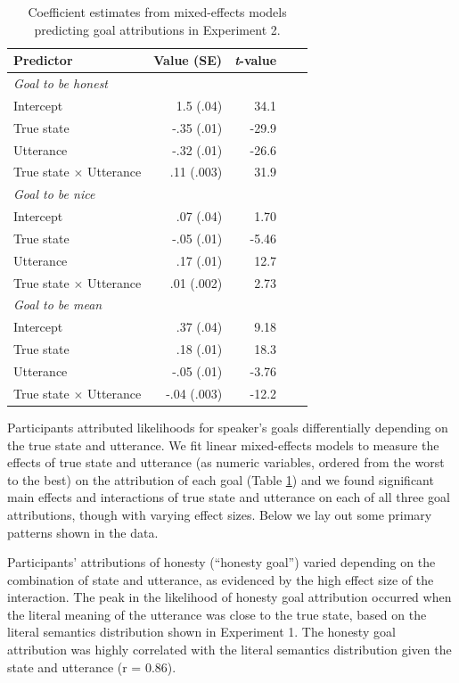 \documentclass[10pt,letterpaper]{article}
\begin{document}
\begin{table}[t]
\caption{\label{tab:lmer1}  Coefficient estimates from mixed-effects models predicting goal attributions in Experiment 2.} 
\begin{center} 
\begin{tabular}{l r r r l} 
\hline
Predictor  &  Value (SE) & \emph{t}-value\\
\hline
\emph{Goal to be honest} \\
Intercept  & 1.5 (.04) & 34.1 \\
True state & -.35 (.01) &  -29.9 \\
Utterance & -.32 (.01) & -26.6 \\
True state $\times$ Utterance & .11 (.003) & 31.9 \\
\emph{Goal to be nice} \\
Intercept  & .07 (.04) & 1.70\\
True state & -.05 (.01) &  -5.46 \\
Utterance & .17 (.01) & 12.7 \\
True state $\times$ Utterance & .01 (.002) & 2.73 \\
\emph{Goal to be mean} \\ 
Intercept  & .37 (.04) & 9.18 \\
True state & .18 (.01) &  18.3 \\
Utterance & -.05 (.01) & -3.76 \\
True state $\times$ Utterance & -.04 (.003) & -12.2 \\
\hline
\end{tabular} 
\end{center} 
\end{table}

Participants attributed likelihoods for speaker's goals differentially depending on the true state and utterance. We fit linear mixed-effects models to measure the effects of true state and utterance (as numeric variables, ordered from the worst to the best) on the attribution of each goal (Table \ref{tab:lmer1}) and we found significant main effects and interactions of true state and utterance on each of all three goal attributions, though with varying effect sizes. Below we lay out some primary patterns shown in the data. %

Participants' attributions of honesty (``honesty goal'') varied depending on the combination of state and utterance, as evidenced by the high effect size of the interaction. The peak in the likelihood of honesty goal attribution occurred when the literal meaning of the utterance was close to the true state, based on the literal semantics distribution shown in Experiment 1. The honesty goal attribution was highly correlated with the literal semantics distribution given the state and utterance (r = 0.86).
\end{document}
